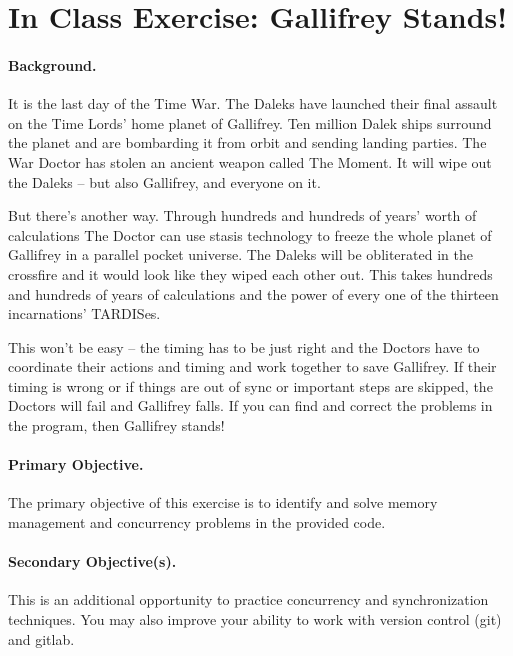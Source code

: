 




\section*{In Class Exercise: Gallifrey Stands!}

\paragraph{Background.}
It is the last day of the Time War. The Daleks have launched their final assault on the Time Lords' home planet of Gallifrey. Ten million Dalek ships surround the planet and are bombarding it from orbit and sending landing parties. The War Doctor has stolen an ancient weapon called The Moment. It will wipe out the Daleks -- but also Gallifrey, and everyone on it.

But there's another way. Through hundreds and hundreds of years' worth of calculations The Doctor can use stasis technology to freeze the whole planet of Gallifrey in a parallel pocket universe. The Daleks will be obliterated in the crossfire and it would look like they wiped each other out. This takes hundreds and hundreds of years of calculations and the power of every one of the thirteen incarnations' TARDISes.

This won't be easy -- the timing has to be just right and the Doctors have to coordinate their actions and timing and work together to save Gallifrey. If their timing is wrong or if things are out of sync or important steps are skipped, the Doctors will fail and Gallifrey falls. If you can find and correct the problems in the program, then Gallifrey stands!


\paragraph{Primary Objective.} The primary objective of this exercise is to identify and solve memory management and concurrency problems in the provided code.

\paragraph{Secondary Objective(s).} This is an additional opportunity to practice concurrency and synchronization techniques. You may also improve your ability to work with version control (git) and gitlab.

